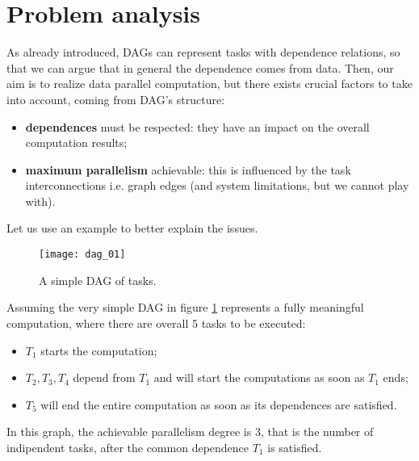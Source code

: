 \documentclass[a4paper,11pt]{article}
\begin{document}
\section{Problem analysis}
As already introduced, DAGs can represent tasks with dependence relations, so that we can argue that in general the dependence comes from data.
Then, our aim is to realize data parallel computation, but there exists crucial factors to take into account, coming from DAG's structure:
	\begin{itemize}
		\item \textbf{dependences} must be respected: they have an impact on the overall computation results;
		\item \textbf{maximum parallelism} achievable: this is influenced by the task interconnections i.e. graph edges (and system limitations, but we cannot play with).
	\end{itemize}
Let us use an example to better explain the issues.
\begin{figure}[h]
	\centering
	\texttt{[image: dag\_01]}
	\caption{A simple DAG of tasks.}
	\label{fig:dag_0}
\end{figure}
Assuming the very simple DAG in figure \ref{fig:dag_0} represents a fully meaningful computation, where there are overall 5 tasks to be executed:
\begin{itemize}
	\item $T_1$ starts the computation;
	\item $T_2,T_3,T_4$ depend from $T_1$ and will start the computations as soon as $T_1$ ends;
	\item $T_5$ will end the entire computation as soon as its dependences are satisfied.
\end{itemize}
In this graph, the achievable parallelism degree is 3, that is the number of indipendent tasks, after the common dependence $T_1$ is satisfied.
\end{document}

